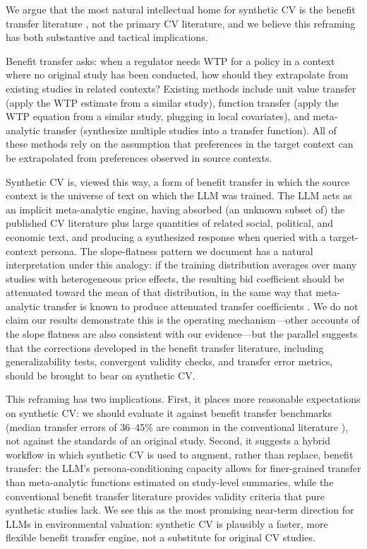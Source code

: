 \documentclass[12pt]{article}
\begin{document}
We argue that the most natural intellectual home for synthetic CV is the
benefit transfer literature \parencite{Rosenberger2017, Loomis2015, Boyle2010},
not the primary CV literature, and we believe this reframing has both
substantive and tactical implications.

Benefit transfer asks: when a regulator needs WTP for a policy in a
context where no original study has been conducted, how should they
extrapolate from existing studies in related contexts? Existing methods
include unit value transfer (apply the WTP estimate from a similar
study), function transfer (apply the WTP equation from a similar study,
plugging in local covariates), and meta-analytic transfer (synthesize
multiple studies into a transfer function). All of these methods rely on
the assumption that preferences in the target context can be
extrapolated from preferences observed in source contexts.

Synthetic CV is, viewed this way, a form of benefit transfer in which
the source context is the universe of text on which the LLM was trained.
The LLM acts as an implicit meta-analytic engine, having absorbed (an
unknown subset of) the published CV literature plus large quantities of
related social, political, and economic text, and producing a
synthesized response when queried with a target-context persona. The
slope-flatness pattern we document has a natural interpretation under
this analogy: if the training distribution averages over many studies
with heterogeneous price effects, the resulting bid coefficient should
be attenuated toward the mean of that distribution, in the same way that
meta-analytic transfer is known to produce attenuated transfer
coefficients \parencite{Bergstrom2006}. We do not claim our results
demonstrate this is the operating mechanism---other accounts of the
slope flatness are also consistent with our evidence---but the parallel
suggests that the corrections developed in the benefit transfer
literature, including generalizability tests, convergent validity
checks, and transfer error metrics, should be brought to bear on
synthetic CV.

This reframing has two implications. First, it places more reasonable
expectations on synthetic CV: we should evaluate it against benefit transfer benchmarks (median transfer errors of 36--45\% are common in the conventional literature \parencite{Rosenberger2017}), not against the standards of an original study. Second, it suggests a hybrid workflow in which synthetic
CV is used to augment, rather than replace, benefit transfer: the LLM's
persona-conditioning capacity allows for finer-grained transfer than
meta-analytic functions estimated on study-level summaries, while the
conventional benefit transfer literature provides validity criteria that
pure synthetic studies lack. We see this as the most promising near-term
direction for LLMs in environmental valuation: synthetic CV is plausibly
a faster, more flexible benefit transfer engine, not a substitute for
original CV studies.
\end{document}
